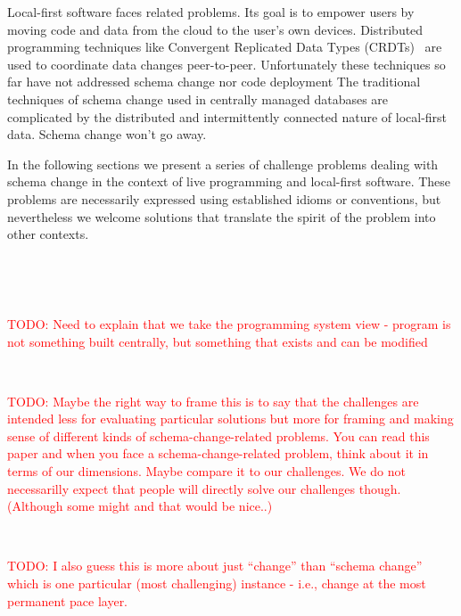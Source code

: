 \documentclass[english,submission]{programming}
\begin{document}
Local-first software faces related problems. Its goal is to empower users by moving code and data from the cloud to the user's own devices. Distributed programming techniques like Convergent Replicated Data Types (CRDTs)~\cite{Shapiro11} are used to coordinate data changes peer-to-peer. Unfortunately these techniques so far have not addressed schema change nor code deployment The traditional techniques of schema change used in centrally managed databases are complicated by the distributed and intermittently connected nature of local-first data. Schema change won't go away.

In the following sections we present a series of challenge problems dealing with schema change in the context of live programming and local-first software. These problems are necessarily expressed using established idioms or conventions, but nevertheless we welcome solutions that translate the spirit of the problem into other contexts.

~

~

\textcolor{red}{TODO: Need to explain that we take the programming system view - program is not something
built centrally, but something that exists and can be modified}

~

\textcolor{red}{TODO: Maybe the right way to frame this is to say that the challenges are intended
less for evaluating particular solutions but more for framing and making sense of different
kinds of schema-change-related problems.  You can read this paper and when you face a schema-change-related
problem, think about it in terms of our dimensions. Maybe compare it to our challenges.
We do not necessarilly expect that people will directly solve our challenges though. (Although
some might and that would be nice..)}

~

\textcolor{red}{TODO: I also guess this is more about just ``change'' than ``schema change''
which is one particular (most challenging) instance - i.e., change at the most permanent
pace layer.}
\end{document}
